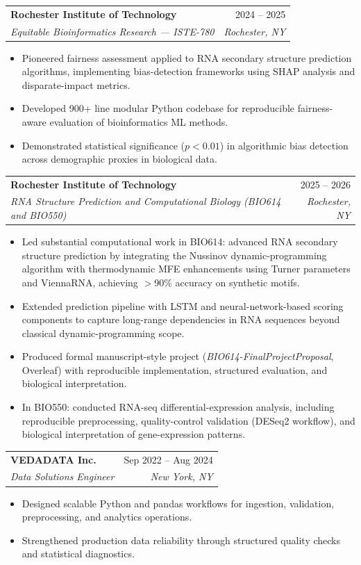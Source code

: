 \documentclass[11pt]{article}
\makeatletter
\newcommand{\entry}[4]{
  \noindent\begin{tabularx}{\textwidth}{@{}Xr@{}}
    \textbf{#1} & #2 \\
    \textit{#3} & \textit{#4}
  \end{tabularx}\vspace{2pt}
}
\makeatother
\begin{document}
\entry{Rochester Institute of Technology}{2024 -- 2025}{Equitable Bioinformatics Research --- ISTE-780}{Rochester, NY}
\begin{itemize}
  \item Pioneered fairness assessment applied to RNA secondary structure prediction algorithms, implementing bias-detection frameworks using SHAP analysis and disparate-impact metrics.
  \item Developed 900+ line modular Python codebase for reproducible fairness-aware evaluation of bioinformatics ML methods.
  \item Demonstrated statistical significance ($p < 0.01$) in algorithmic bias detection across demographic proxies in biological data.
\end{itemize}

\entry{Rochester Institute of Technology}{2025 -- 2026}{RNA Structure Prediction and Computational Biology (BIO614 and BIO550)}{Rochester, NY}
\begin{itemize}
  \item Led substantial computational work in BIO614: advanced RNA secondary structure prediction by integrating the Nussinov dynamic-programming algorithm with thermodynamic MFE enhancements using Turner parameters and ViennaRNA, achieving $>$90\% accuracy on synthetic motifs.
  \item Extended prediction pipeline with LSTM and neural-network-based scoring components to capture long-range dependencies in RNA sequences beyond classical dynamic-programming scope.
  \item Produced formal manuscript-style project (\textit{BIO614-FinalProjectProposal}, Overleaf) with reproducible implementation, structured evaluation, and biological interpretation.
  \item In BIO550: conducted RNA-seq differential-expression analysis, including reproducible preprocessing, quality-control validation (DESeq2 workflow), and biological interpretation of gene-expression patterns.
\end{itemize}

\entry{VEDADATA Inc.}{Sep 2022 -- Aug 2024}{Data Solutions Engineer}{New York, NY}
\begin{itemize}
  \item Designed scalable Python and pandas workflows for ingestion, validation, preprocessing, and analytics operations.
  \item Strengthened production data reliability through structured quality checks and statistical diagnostics.
\end{itemize}
\end{document}
